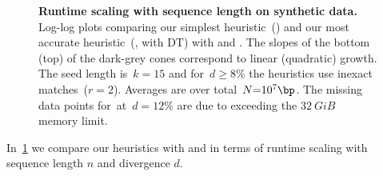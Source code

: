 \begin{figure}[H]
{  \label{fig:tools-10}}
  \hfill
  \caption[Runtime scaling with sequence length on synthetic data]{\textbf{Runtime scaling with sequence length on synthetic data.}
  Log-log plots comparing our simplest heuristic~(\SH) and our most accurate
  heuristic~(\GCH, with DT) with \edlib and \wfa. The slopes of the bottom (top)
  of the dark-grey cones correspond to linear (quadratic) growth. The seed
  length is~$k{=}15$ and for~$d{\geq}8\%$ the heuristics use inexact
  matches~($r{=}2$). Averages are over total~$N{=}10^7\bp$. The missing data
  points for~\SH at~$d{=}12\%$ are due to exceeding the $\qty{32}{GiB}$ memory
  limit.}
  \label{fig:tools}
\end{figure}

In~\cref{fig:tools} we compare our \A heuristics with \edlib and \wfa in terms
of runtime scaling with sequence length $n$ and divergence $d$.
